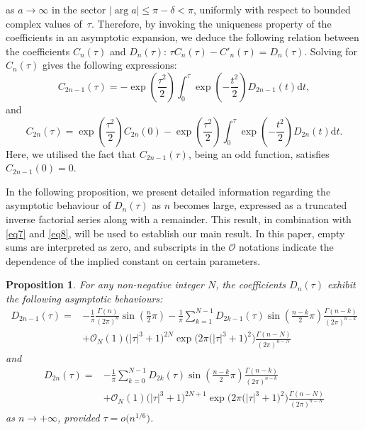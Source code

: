 \documentclass[11pt]{article}
\numberwithin{equation}{section}
\def\d{\mathrm{d}}
\numberwithin{equation}{section}
\newtheorem{Proposition}[Theorem]{Proposition}
 { \theoremstyle{definition}
\newtheorem{Definition}[Theorem]{Definition}
\newtheorem{Note}[Theorem]{Note}
\newtheorem{Example}[Theorem]{Example}
\newtheorem{Remark}[Theorem]{Remark} }
\begin{document}
as $a\to \infty$ in the sector $|\arg a| \le \pi-\delta<\pi$, uniformly with respect to bounded complex values of~$\tau$. Therefore, by invoking the uniqueness property of the coefficients in an asymptotic expansion, we deduce the following relation between the coefficients $C_n(\tau)$ and $D_n(\tau)$: $\tau C_n (\tau ) - C'_n (\tau ) = D_n (\tau )$. Solving for $C_n(\tau)$ gives the following expressions:
\begin{equation}\label{eq7}
C_{2n-1} (\tau ) = -\exp \left(\frac{\tau^2}{2} \right)\int_0^\tau \exp \left(- \frac{t^2 }{2}\right)D_{2n-1} (t)\d t,
\end{equation}
and
\begin{equation}\label{eq8}
C_{2n} (\tau ) = \exp \left(\frac{\tau^2}{2}\right) C_{2n} (0) - \exp \left( \frac{\tau^2}{2}\right)\int_0^\tau \exp \left(-\frac{t^2}{2}\right)D_{2n} (t)\d t.
\end{equation}
Here, we utilised the fact that $C_{2n-1} (\tau )$, being an odd function, satisfies $C_{2n-1} (0)=0$.

In the following proposition, we present detailed information regarding the asymptotic behaviour of $D_n(\tau)$ as $n$ becomes large, expressed as a truncated inverse factorial series along with a remainder. This result, in combination with \eqref{eq7} and \eqref{eq8}, will be used to establish our main result. In this paper, empty sums are interpreted as zero, and subscripts in the $\mathcal{O}$ notations indicate the dependence of the implied constant on certain parameters.

\begin{Proposition}\label{prop1} For any non-negative integer $N$, the coefficients $D_n(\tau)$ exhibit the following asymptotic behaviours:
\begin{align}
D_{2n - 1} (\tau ) ={}& -\frac{1}{\pi}\frac{\Gamma (n)}{(2\pi )^n } \sin \left( \frac{n}{2}\pi \right) -\frac{1}{\pi}\sum_{k = 1}^{N - 1} D_{2k - 1} (\tau )\sin \left( \frac{n - k}{2}\pi \right)\frac{\Gamma (n - k)}{(2\pi )^{n - k}}\nonumber \\ & +\mathcal{O}_N (1)\bigl(\left| \tau \right|^3 + 1\bigr)^{2N} \exp \big( 2\pi \bigl(\left| \tau \right|^3 + 1\bigr)^2 \big)\frac{\Gamma (n - N)}{(2\pi )^{n - N}}\label{eq10}
\end{align}
and
\begin{align}
D_{2n} (\tau ) ={}& -\frac{1}{\pi}\sum_{k = 0}^{N - 1} D_{2k} (\tau )\sin \left( \frac{n - k}{2}\pi \right)\frac{\Gamma (n - k)}{(2\pi )^{n - k}} \nonumber\\ & +\mathcal{O}_N (1)\bigl(\left| \tau \right|^3 + 1\bigr)^{2N+1} \exp \big( 2\pi \bigl(\left| \tau \right|^3 + 1\bigr)^2 \big)\frac{\Gamma (n - N)}{(2\pi )^{n - N}}\label{eq11}
\end{align}
as $n\to+\infty$, provided $\tau = o\big(n^{1/6}\big)$.
\end{Proposition}
\end{document}
